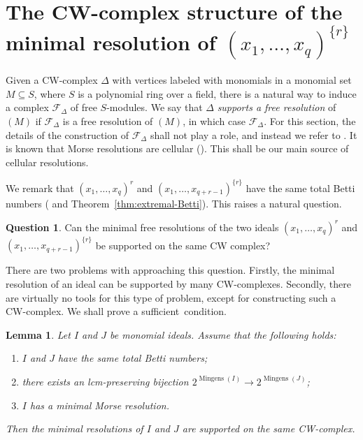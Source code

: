 \documentclass[reqno]{amsart}
\DeclareMathOperator{\mingens}{Mingens}
\newtheorem{lemma}[theorem]{Lemma}
\theoremstyle{definition}
\newtheorem{question}[theorem]{Question}
\theoremstyle{remark}
\numberwithin{equation}{section}
\begin{document}
\section{The CW-complex structure of the minimal resolution of $(x_1,\dots, x_q)^{\{r\}}$}

Given a CW-complex $\Delta$ with vertices labeled with monomials in a monomial set $M\subseteq S$, where $S$ is a polynomial ring over a field,  there is a natural way to induce a complex $\mathcal{F}_\Delta$ of free $S$-modules. We say that $\Delta$ \emph{supports a free resolution} of $(M)$ if $\mathcal{F}_{\Delta}$ is a free resolution of $(M)$, in which case $\mathcal{F}_\Delta$. For this section, the details of the construction of $\mathcal{F}_\Delta$ shall  not play a role, and instead we refer  to \cite[page 148]{BW02}. It is known that Morse resolutions are cellular (\cite[Theorem~1.3]{BW02}). This shall be our main source of cellular resolutions.


We remark that $(x_1,\dots, x_q)^r$ and $(x_1,\dots, x_{q+r-1})^{\{r\}}$ have the same total Betti numbers (\cite[Example~1]{EliKer} and Theorem~\ref{thm:extremal-Betti}). This raises a natural question.

\begin{question}\label{ques:same-CW-complex}
    Can the minimal free resolutions of the two ideals $(x_1,\dots, x_q)^r$ and $(x_1,\dots, x_{q+r-1})^{\{r\}}$ be supported on the same CW complex?
\end{question}

There are two problems with approaching this question. Firstly, the minimal resolution of an ideal can be supported by many CW-complexes. Secondly, there are virtually no tools for this type of problem, except for constructing such a CW-complex. We shall prove a sufficient~condition.

\begin{lemma}\label{lem:sufficient-condition-same-CW-complex}
    Let $I$ and $J$ be monomial ideals. Assume that the following holds:
    \begin{enumerate}
        \item $I$ and $J$ have the same total Betti numbers;
        \item there exists an lcm-preserving bijection  $2^{\mingens(I)}\to 2^{\mingens(J)}$;
        \item $I$ has a minimal Morse resolution.
    \end{enumerate}
    Then the minimal resolutions of $I$ and $J$ are supported on the same CW-complex.
\end{lemma}
\end{document}
